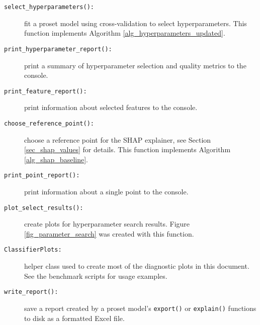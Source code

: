 \begin{description}
%
\begin{description}
\item[\texttt{select\_hyperparameters():}] fit a proset model using cross-validation to select hyperparameters.
This function implements Algorithm \ref{alg_hyperparameters_updated}.
%
\item[\texttt{print\_hyperparameter\_report():}] print a summary of hyperparameter selection and quality metrics to the console.
%
\item[\texttt{print\_feature\_report():}] print information about selected features to the console.
%
\item[\texttt{choose\_reference\_point():}] choose a reference point for the SHAP explainer, see Section \ref{sec_shap_values} for details.
This function implements Algorithm \ref{alg_shap_baseline}.
%
\item[\texttt{print\_point\_report():}] print information about a single point to the console.
%
\item[\texttt{plot\_select\_results():}] create plots for hyperparameter search results.
Figure \ref{fig_parameter_search} was created with this function.
%
\item[\texttt{ClassifierPlots:}] helper class used to create most of the diagnostic plots in this document.
See the benchmark scripts for usage examples.
%
\item[\texttt{write\_report():}] save a report created by a proset model's \texttt{export()} or \texttt{explain()} functions to disk as a formatted Excel file.
\end{description}
\end{description}
%
